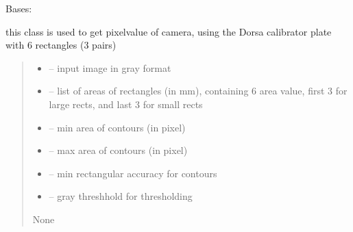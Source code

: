 \documentclass[letterpaper,10pt,english]{sphinxmanual}
\begin{document}
\begin{savenotes}\begin{fulllineitems}
\label{\detokenize{setting/backend/pxvalue_calibration:oxin.backend.pxvalue_calibration.extract_info}}
\pysigstartsignatures
{}
\pysigstopsignatures
\sphinxAtStartPar
Bases: 

\sphinxAtStartPar
this class is used to get pixel\sphinxhyphen{}value of camera, using the Dorsa calibrator plate with 6 rectangles (3 pairs)
\begin{quote}\begin{description}
\begin{itemize}
\item {} 
\sphinxAtStartPar
{} – input image in gray format

\item {} 
\sphinxAtStartPar
{} – list of areas of rectangles (in mm), containing 6 area value, first 3 for large rects, and last 3 for small rects

\item {} 
\sphinxAtStartPar
{} – min area of contours (in pixel)

\item {} 
\sphinxAtStartPar
{} – max area of contours (in pixel)

\item {} 
\sphinxAtStartPar
{} – min rectangular accuracy for contours

\item {} 
\sphinxAtStartPar
{} – gray threshhold for thresholding

\end{itemize}

\sphinxAtStartPar
None


\end{description}
\end{quote}
\end{fulllineitems}
\end{savenotes}
\end{document}
